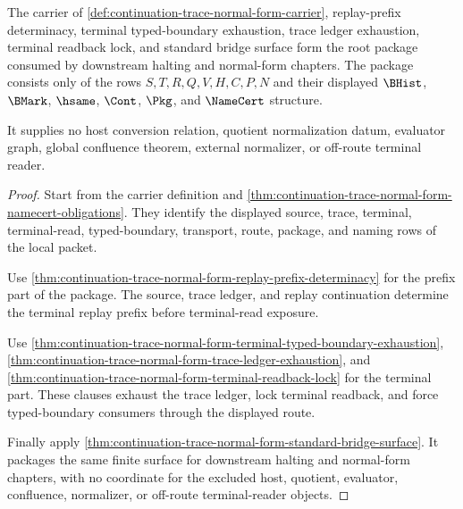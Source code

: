 \begin{theorem}
\label{thm:continuation-trace-normal-form-root-unblock-package}
The carrier of \autoref{def:continuation-trace-normal-form-carrier}, replay-prefix determinacy, terminal typed-boundary exhaustion, trace ledger exhaustion, terminal readback lock, and standard bridge surface form the root package consumed by downstream halting and normal-form chapters. The package consists only of the rows $S,T,R,Q,V,H,C,P,N$ and their displayed $\BHist$, $\BMark$, $\hsame$, $\Cont$, $\Pkg$, and $\NameCert$ structure.

It supplies no host conversion relation, quotient normalization datum, evaluator graph, global confluence theorem, external normalizer, or off-route terminal reader.
\end{theorem}
\begin{proof}
Start from the carrier definition and \autoref{thm:continuation-trace-normal-form-namecert-obligations}. They identify the displayed source, trace, terminal, terminal-read, typed-boundary, transport, route, package, and naming rows of the local packet.

Use \autoref{thm:continuation-trace-normal-form-replay-prefix-determinacy} for the prefix part of the package. The source, trace ledger, and replay continuation determine the terminal replay prefix before terminal-read exposure.

Use \autoref{thm:continuation-trace-normal-form-terminal-typed-boundary-exhaustion}, \autoref{thm:continuation-trace-normal-form-trace-ledger-exhaustion}, and \autoref{thm:continuation-trace-normal-form-terminal-readback-lock} for the terminal part. These clauses exhaust the trace ledger, lock terminal readback, and force typed-boundary consumers through the displayed route.

Finally apply \autoref{thm:continuation-trace-normal-form-standard-bridge-surface}. It packages the same finite surface for downstream halting and normal-form chapters, with no coordinate for the excluded host, quotient, evaluator, confluence, normalizer, or off-route terminal-reader objects.
\end{proof}

